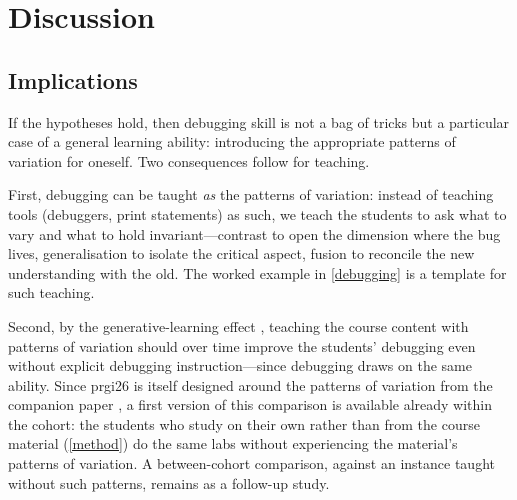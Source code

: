 \mode*
\section{Discussion}
\label{discussion}

\subsection{Implications}

If the hypotheses hold, then debugging skill is not a bag of tricks but a
particular case of a general learning ability: introducing the appropriate
patterns of variation for oneself.
Two consequences follow for teaching.

First, debugging can be taught \emph{as} the patterns of variation: instead of
teaching tools (debuggers, print statements) as such, we teach the students to
ask what to vary and what to hold invariant---contrast to open the dimension
where the bug lives, generalisation to isolate the critical aspect, fusion to
reconcile the new understanding with the old.
The worked example in \cref{debugging} is a template for such teaching.

Second, by the generative-learning effect
\autocites[pp.~227--228]{NCOL}{HolmqvistGustavssonWernberg2007}, teaching the
course content with
patterns of variation should over time improve the students' debugging even
without explicit debugging instruction---since debugging draws on the same
ability.
Since prgi26 is itself designed around the patterns of variation from the
companion paper \autocite{VTProgMisconceptions}, a first version of this
comparison is available already within the cohort: the students who study on
their own rather than from the course material (\cref{method}) do the same
labs without experiencing the material's patterns of variation.
A between-cohort comparison, against an instance taught without such
patterns, remains as a follow-up study.


